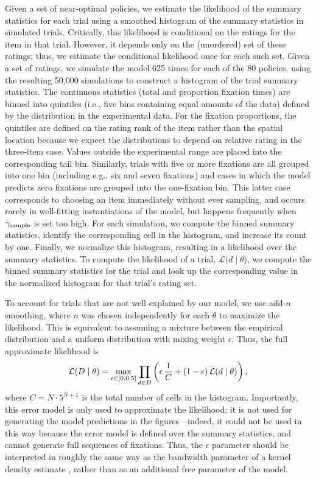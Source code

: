 Given a set of near-optimal policies, we estimate the likelihood of the summary statistics for each trial using a smoothed histogram of the summary statistics in simulated trials. Critically, this likelihood is conditional on the ratings for the item in that trial. However, it depends only on the (unordered) set of these ratings; thus, we estimate the conditional likelihood once for each such set. Given a set of ratings, we simulate the model 625 times for each of the 80 policies, using the resulting 50,000 simulations to construct a histogram of the trial summary statistics. The continuous statistics (total and proportion fixation times) are binned into quintiles (i.e., five bins containing equal amounts of the data) defined by the distribution in the experimental data. For the fixation proportions, the quintiles are defined on the rating rank of the item rather than the spatial location because we expect the distributions to depend on relative rating in the three-item case. Values outside the experimental range are placed into the corresponding tail bin. Similarly, trials with five or more fixations are all grouped into one bin (including e.g., six and seven fixations) and cases in which the model predicts zero fixations are grouped into the one-fixation bin. This latter case corresponds to choosing an item immediately without ever sampling, and occurs  rarely in well-fitting instantiations of the model, but happens frequently when $\gamma_\text{sample}$ is set too high. For each simulation, we compute the binned summary statistics, identify the corresponding cell in the histogram, and increase its count by one. Finally, we normalize this histogram, resulting in a likelihood over the summary statistics. To compute the likelihood of a trial, $\mathcal{L}(d \mid \theta$), we compute the binned summary statistics for the trial and look up the corresponding value in the normalized histogram for that trial's rating set.

 
To account for trials that are not well explained by our model, we use add-$n$ smoothing, where $n$ was chosen independently for each $\theta$ to maximize the likelihood. This is equivalent to assuming a mixture between the empirical distribution and a uniform distribution with mixing weight $\epsilon$. Thus, the full approximate likelihood is
\[
\mathcal{L}(D \mid \theta) = \max_{\epsilon\in[0,0.5]} 
  \prod_{d\in D} \left( 
    \epsilon\,\frac{1}{C}+(1-\epsilon)\,\mathcal{L}(d\mid\theta) 
  \right),
\]
where $C=N\cdot5^{N+1}$ is the total number of cells in the histogram. Importantly, this error model is only used to approximate the likelihood; it is not used for generating the model predictions in the figures---indeed, it could not be used in this way because the error model is defined over the summary statistics, and cannot generate full sequences of fixations. Thus, the $\epsilon$ parameter should be interpreted in roughly the same way as the bandwidth parameter of a kernel density estimate \citep{turner2014generalized}, rather than as an additional free parameter of the model.


